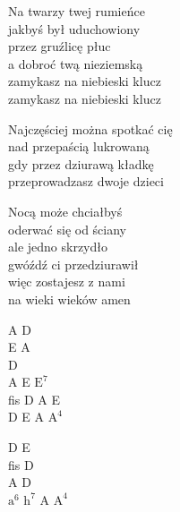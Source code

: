 \begin{text}
    Na twarzy twej rumieńce\\
    jakbyś był uduchowiony\\
    przez gruźlicę płuc\\
    a dobroć twą nieziemską\\
    zamykasz na niebieski klucz\\
    zamykasz na niebieski klucz

    \vin Najczęściej można spotkać cię\\
    \vin nad przepaścią lukrowaną\\
    \vin gdy przez dziurawą kładkę\\
    \vin przeprowadzasz dwoje dzieci

    Nocą może chciałbyś\\
    oderwać się od ściany\\
    ale jedno skrzydło\\
    gwóźdź ci przedziurawił\\
    więc zostajesz z nami\\
    na wieki wieków amen
\end{text}
\begin{chord}
    A D\\
    E A\\
    D\\
    A E $\mathrm{E^{7}}$\\
    fis D A E\\
    D E A $\mathrm{A^{4}}$

    D E\\
    fis D\\
    A D\\
    $\mathrm{a^{6}}$ $\mathrm{h^{7}}$ A $\mathrm{A^{4}}$
\end{chord}
